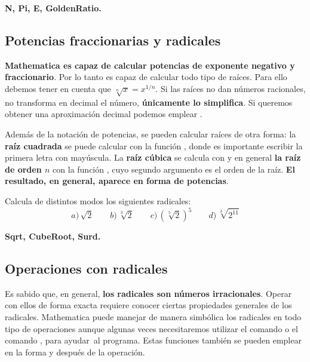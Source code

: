 \documentclass[a4paper,10pt, draft]{article}
\newcommand{\com}[1]{\textbf{\color{blue}{#1}}}
\newenvironment{ejer}{\begin{tcolorbox}[center title, title=Ejercicios,
fonttitle=\sffamily\bfseries,colback=blue!5,colframe=orange]}{\end{tcolorbox}}
\newenvironment{funciones}{\begin{tcolorbox}[center title, title=Nuevas funciones, fonttitle=\sffamily\bfseries, colback=green!5!white,colframe=red!75!black]}{\end{tcolorbox}\bigskip}
\begin{document}
\begin{funciones}

\textbf{N, Pi, E, GoldenRatio.}


\end{funciones}

\newpage



\subsection{Potencias fraccionarias y radicales}

\textbf{Mathematica es capaz de calcular potencias de exponente negativo y fraccionario}. Por lo tanto es capaz de calcular todo tipo de raíces. Para ello debemos tener en cuenta que  $\sqrt[n]{x} = x^{1/n}$. Si las raíces no dan números racionales, no transforma en decimal el número, \textbf{únicamente lo simplifica}. Si queremos obtener una aproximación decimal podemos emplear \com{N[x]}.

Además de la notación de potencias, se pueden calcular raíces de otra forma: la \textbf{raíz cuadrada} se puede calcular con la función \com{Sqrt[x]}, donde es importante escribir la primera letra con mayúscula. La \textbf{raíz cúbica} se calcula con \com{CubeRoot[x]} y en general \textbf{la raíz de orden $n$} con la función \com{Surd[x,n]}, cuyo segundo argumento es el orden de la raíz. \textbf{El resultado, en general, aparece en forma de potencias}.

\begin{ejer}

Calcula de distintos modos los siguientes radicales:
$$
 a)\,\sqrt{2}\qquad b)\, \sqrt[3]{2} \qquad c)\,\left(\sqrt[5]{2}\right)^5 \qquad d)\, 
 \sqrt[3]{2^{11}}
$$

\end{ejer}



\begin{funciones}

\textbf{Sqrt, CubeRoot, Surd.}


\end{funciones}

\newpage

\subsection{Operaciones con radicales}


Es sabido que, en general, \textbf{los radicales son números irracionales}. Operar con ellos de forma exacta requiere conocer ciertas propiedades generales de los radicales. Mathematica puede manejar de manera simbólica los radicales en todo tipo de operaciones aunque algunas veces necesitaremos utilizar el comando \com{Simplify[x]} o el comando \com{Expand[x]}, para \guillemotleft ayudar\guillemotright\  al programa. Estas funciones también se pueden emplear en la forma \com{//Simplify} y \com{//Expand} después de la operación.
\end{document}
